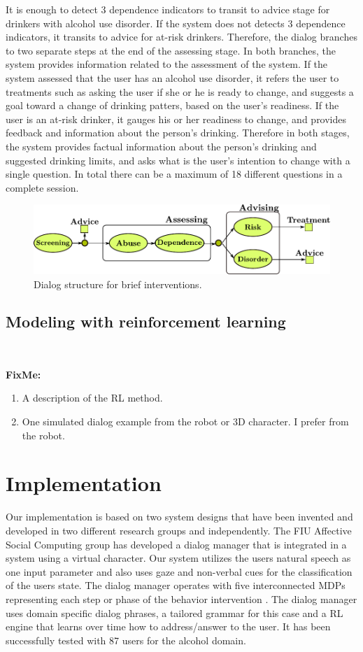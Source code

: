 \documentclass[letterpaper]{article}
\begin{document}
It is enough to detect 3 dependence indicators to transit to advice stage 
for drinkers with alcohol use disorder.  If the system does not detects 3 dependence 
indicators, it transits to advice for at-risk drinkers. Therefore, the dialog branches to two 
separate steps at the end of the assessing stage. In both branches, the system provides information 
related to the assessment of the system.  If the system assessed that the user has an alcohol use 
disorder, it refers the user to treatments such as asking  the user if she or he is ready to 
change, and suggests a goal toward a change of drinking patters, based on the user's readiness. If 
the user is an at-risk drinker, it gauges his or her readiness to change, and provides feedback and 
information about the person's drinking. Therefore in both stages, the system provides factual 
information about the person's drinking and suggested drinking limits, and asks what is the user's 
intention to change with a single question.  In total there can be a maximum of 18 different 
questions in a complete session.   

\begin{figure}[!t] 
\centering 
\includegraphics[width=.45\textwidth]{figures/dialog_manager} 
\caption{Dialog structure for brief interventions.} 
\label{fig:dialog_manager} 
\end{figure}

\subsection*{Modeling with reinforcement learning}

~
{ \color{red}
\textbf{FixMe:}
\begin{enumerate}
 \item A description of the RL method. 
 \item One simulated dialog example from the robot or 3D character. I prefer from the robot. 
\end{enumerate}
}


\section*{Implementation} 

Our implementation is based on two system designs that have been
invented and developed in two different research groups and independently. The FIU Affective Social Computing group has developed a dialog manager that is integrated in a system using a virtual 
character.  Our system utilizes the users natural speech as one input parameter and also uses gaze
and non-verbal cues for the classification of the users state. The dialog manager operates with five
interconnected MDPs representing each step or phase of the behavior intervention 
\cite{YASCLL14}. The dialog manager uses domain specific dialog phrases, a tailored grammar for
this case and a RL engine that learns over time how to address/answer to the user. It has been
successfully tested with 87 users for the alcohol domain.
\end{document}
